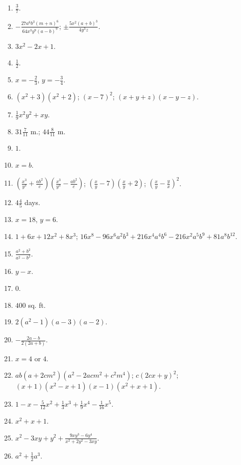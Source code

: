 \documentclass{book}
\begin{document}
\begin{enumerate}
\item $ \frac{3}{7}$.

\item $\displaystyle
-\frac{27a^6b^3\left(m+n\right)^6}{64x^3y^9\left(a-b\right)^9}$;
$\displaystyle \pm \frac{5x^2\left(a+b\right)^3}{4y^3z}$.

\item $3x^2-2x+1$. \item $\frac{1}{2}$. \item $x=-\frac{2}{3}$,
$y=-\frac{3}{4}$. \item $(x^2+3)(x^2+2)$; $\left(x-7\right)^2$;
$(x+y+z)(x-y-z)$. \item $\frac{1}{9}x^2y^2+xy$. \item
$31\frac{7}{11}$ m.; $44\frac{8}{11}$ m. \item $1$.

\item $x=b$.

\item $\displaystyle\left( \frac{x^3}{y^3} + \frac{ab^2}{c}
\right) \left( \frac{x^3}{y^3} - \frac{ab^2}{c} \right)$;
$\displaystyle \left( \frac{x}{y} - 7 \right) \left( \frac{x}{y} +
2 \right)$; $\displaystyle \left( \frac{x}{y} - \frac{y}{x}
\right)^2$.

\item $4\frac{4}{5}$ days. \item $x=18$, $y=6$. \item
$1+6x+12x^2+8x^3$;
$16x^8-96x^6a^2b^3+216x^4a^4b^6-216x^2a^5b^9+81a^8b^{12}$. \item
$\displaystyle \frac{a^2+b^2}{a^2-b^2}$. \item $y-x$. \item $0$.
\item $400$ sq. ft. \item $2(a^2-1)(a-3)(a-2)$.

\item $\displaystyle -\frac{2a-b}{2(2a+b)}$.

\item $x=4$ or $4$. \item $ab(a+2cm^2)(a^2-2acm^2+c^2m^4)$;
$c\left(2cx+y\right)^2$; $(x+1)(x^2-x+1)(x-1)(x^2+x+1)$. \item
$1-x-\frac{5}{12}x^2+\frac{1}{3}x^3+\frac{1}{9}x^4-\frac{1}{16}x^5$.
\item $x^2+x+1$. \item
$x^2-3xy+y^2+\frac{9xy^3-6y^4}{x^2+2y^2-3xy}$. \item
$a^2+\frac{1}{2}a^3$.


\end{enumerate}
\end{document}
